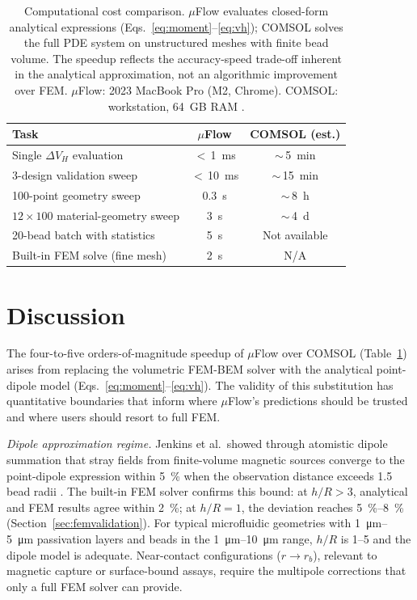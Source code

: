 \documentclass[preprint,review,12pt]{elsarticle}
\begin{document}
\begin{table}[!htbp]
\caption{Computational cost comparison. $\mu$Flow evaluates closed-form analytical expressions (Eqs.~\eqref{eq:moment}--\eqref{eq:vh}); COMSOL solves the full PDE system on unstructured meshes with finite bead volume. The speedup reflects the accuracy-speed trade-off inherent in the analytical approximation, not an algorithmic improvement over FEM. $\mu$Flow: 2023 MacBook Pro (M2, Chrome). COMSOL: workstation, 64~GB RAM \cite{govindaraju2025}.}
\label{tab:performance}
\centering
\small
\begin{tabular}{lcc}
\toprule
Task & $\mu$Flow & COMSOL (est.) \\
\midrule
Single $\Delta V_H$ evaluation & ${<}$\,\SI{1}{\milli\second} & ${\sim}$\,\SI{5}{\minute} \\
3-design validation sweep & ${<}$\,\SI{10}{\milli\second} & ${\sim}$\,\SI{15}{\minute} \\
100-point geometry sweep & \SI{0.3}{\second} & ${\sim}$\,\SI{8}{\hour} \\
$12 \times 100$ material-geometry sweep & \SI{3}{\second} & ${\sim}$\,\SI{4}{\day} \\
20-bead batch with statistics & \SI{5}{\second} & Not available \\
Built-in FEM solve (fine mesh) & \SI{2}{\second} & N/A \\
\bottomrule
\end{tabular}
\end{table}


\section{Discussion}
\label{sec:discussion}

The four-to-five orders-of-magnitude speedup of $\mu$Flow over COMSOL (Table~\ref{tab:performance}) arises from replacing the volumetric FEM-BEM solver with the analytical point-dipole model (Eqs.~\eqref{eq:moment}--\eqref{eq:vh}). The validity of this substitution has quantitative boundaries that inform where $\mu$Flow's predictions should be trusted and where users should resort to full FEM.

\textit{Dipole approximation regime.} Jenkins et al.\ showed through atomistic dipole summation that stray fields from finite-volume magnetic sources converge to the point-dipole expression within \SI{5}{\percent} when the observation distance exceeds 1.5 bead radii \cite{jenkins2019}. The built-in FEM solver confirms this bound: at $h/R > 3$, analytical and FEM results agree within \SI{2}{\percent}; at $h/R = 1$, the deviation reaches \SI{5}{\percent}--\SI{8}{\percent} (Section~\ref{sec:femvalidation}). For typical microfluidic geometries with \SIrange{1}{5}{\micro\meter} passivation layers and beads in the \SIrange{1}{10}{\micro\meter} range, $h/R$ is 1--5 and the dipole model is adequate. Near-contact configurations ($r \to r_b$), relevant to magnetic capture or surface-bound assays, require the multipole corrections that only a full FEM solver can provide.
\end{document}
